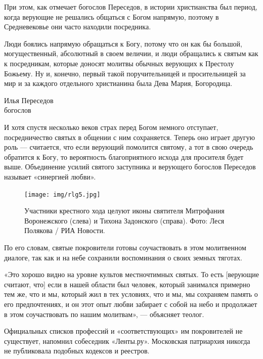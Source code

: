 При этом, как отмечает богослов Переседов, в истории христианства был период, когда верующие не решались общаться с Богом напрямую, поэтому в Средневековье они часто находили посредника.

\begin{fancyquotes}
    Люди боялись напрямую обращаться к Богу, потому что он как бы большой, могущественный, абсолютный в своем величии, и люди обращались к святым как к посредникам, которые доносят молитвы обычных верующих к Престолу Божьему. Ну и, конечно, первый такой поручительницей и просительницей за мир и за каждого отдельного христианина была Дева Мария, Богородица.\\

    \begin{flushright}
        Илья Переседов\\
        богослов
    \end{flushright}
\end{fancyquotes}

И хотя спустя несколько веков страх перед Богом немного отступает, посредничество святых в общении с ним сохраняется. Теперь оно играет другую роль — считается, что если верующий помолится святому, а тот в свою очередь обратится к Богу, то вероятность благоприятного исхода для просителя будет выше. Объединение усилий святого заступника и верующего богослов Переседов называет «синергией любви».

\begin{figure}
    \centering
    \texttt{[image: img/rlg5.jpg]}
    \caption{Участники крестного хода целуют иконы святителя Митрофания Воронежского (слева) и Тихона Задонского (справа). Фото: Леся Полякова / РИА Новости.}
\end{figure}

По его словам, святые покровители готовы соучаствовать в этом молитвенном диалоге, так как и на небе сохранили воспоминания о своих земных тяготах.

«Это хорошо видно на уровне культов местночтимных святых. То есть [верующие считают, что] если в нашей области был человек, который занимался примерно тем же, что и мы, который жил в тех условиях, что и мы, мы сохраняем память о его предпочтениях, и он этот опыт любви забирает с собой на небо и продолжает в этом соучаствовать по нашим молитвам», — объясняет теолог.

Официальных списков профессий и «соответствующих» им покровителей не существует, напомнил собеседник «Ленты.ру». Московская патриархия никогда не публиковала подобных кодексов и реестров.

